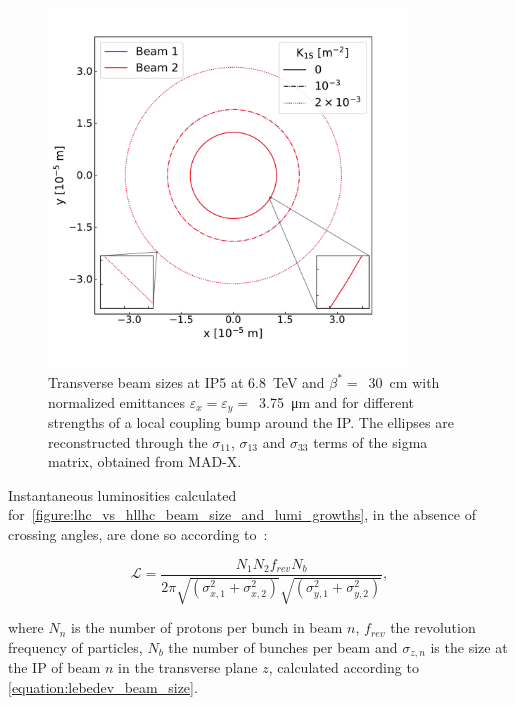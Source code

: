 \begin{figure}[!htb]
    \centering
    \includegraphics*[width=0.85\textwidth]{Figures/IR_Coupling_Correction/ellipses_various_coupling_bumps.pdf}
    \caption{Transverse beam sizes at IP\num{5} at \qty{6.8}{\tera\electronvolt} and \(\beta^{\ast}=\)~\qty{30}{\centi\meter} with normalized emittances \(\varepsilon_x = \varepsilon_y =\)~\qty{3.75}{\micro\meter} and for different strengths of a local coupling bump around the IP. The ellipses are reconstructed through the \(\sigma_{11}\), \(\sigma_{13}\) and \(\sigma_{33}\) terms of the sigma matrix, obtained from MAD-X.}
    \label{figure:ip_ellipses_from_coupling}
\end{figure}
\break

Instantaneous luminosities calculated for~\cref{figure:lhc_vs_hllhc_beam_size_and_lumi_growths}, in the absence of crossing angles, are done so according to~\cite{CERN:Herr:Concept_Luminosity}:

\begin{equation}
    \mathcal{L} = \frac{N_1 N_2 f_{rev} N_b}{2 \pi \sqrt{\left( \sigma_{x, 1}^2 + \sigma_{x, 2}^2 \right)} \sqrt{\left( \sigma_{y, 1}^2 + \sigma_{y, 2}^2 \right)}} ,
    \label{equation:luminosity_double_beams}
\end{equation}
\vspace{1pt}

\noindent
where \(N_{n}\) is the number of protons per bunch in beam \(n\), \(f_{rev}\) the revolution frequency of particles, \(N_b\) the number of bunches per beam and \(\sigma_{z, n}\) is the size at the IP of beam \(n\) in the transverse plane \(z\), calculated according to \cref{equation:lebedev_beam_size}.

